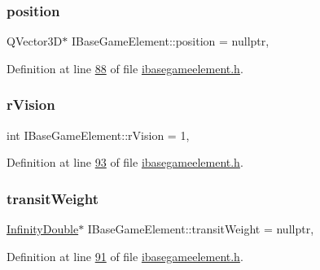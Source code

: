 \subsubsection{\texorpdfstring{position}{position}}
{\footnotesize\ttfamily Q\+Vector3D$\ast$ I\+Base\+Game\+Element\+::position = nullptr\hspace{0.3cm}{\ttfamily [protected]}, {\ttfamily [inherited]}}



Definition at line \hyperlink{a00047_source_l00088}{88} of file \hyperlink{a00047_source}{ibasegameelement.\+h}.

\mbox{\label{a00137_ae0ad3c240950eba352aeb04e6a9296b4}} 
\subsubsection{\texorpdfstring{r\+Vision}{rVision}}
{\footnotesize\ttfamily int I\+Base\+Game\+Element\+::r\+Vision = 1\hspace{0.3cm}{\ttfamily [protected]}, {\ttfamily [inherited]}}



Definition at line \hyperlink{a00047_source_l00093}{93} of file \hyperlink{a00047_source}{ibasegameelement.\+h}.

\mbox{\label{a00137_a865c937433f7d46665ca17e5adccd9df}} 
\subsubsection{\texorpdfstring{transit\+Weight}{transitWeight}}
{\footnotesize\ttfamily \hyperlink{a00161}{Infinity\+Double}$\ast$ I\+Base\+Game\+Element\+::transit\+Weight = nullptr\hspace{0.3cm}{\ttfamily [protected]}, {\ttfamily [inherited]}}



Definition at line \hyperlink{a00047_source_l00091}{91} of file \hyperlink{a00047_source}{ibasegameelement.\+h}.

\mbox{\label{a00137_a73a4ca23072b617f3d17004e3c671bca}} 
